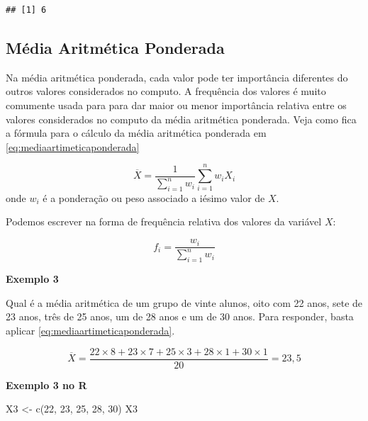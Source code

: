 \documentclass[
]{book}
\newenvironment{Shaded}{\begin{snugshade}}{\end{snugshade}}
\newcommand{\DecValTok}[1]{\textcolor[rgb]{0.00,0.00,0.81}{#1}}
\newcommand{\FunctionTok}[1]{\textcolor[rgb]{0.00,0.00,0.00}{#1}}
\newcommand{\NormalTok}[1]{#1}
\newcommand{\OtherTok}[1]{\textcolor[rgb]{0.56,0.35,0.01}{#1}}
\begin{document}
\begin{verbatim}
## [1] 6
\end{verbatim}

\hypertarget{muxe9dia-aritmuxe9tica-ponderada}{%
\subsection{Média Aritmética Ponderada}\label{muxe9dia-aritmuxe9tica-ponderada}}

Na média aritmética ponderada, cada valor pode ter importância diferentes do outros valores considerados no computo. A frequência dos valores é muito comumente usada para para dar maior ou menor importância relativa entre os valores considerados no computo da média aritmética ponderada. Veja como fica a fórmula para o cálculo da média aritmética ponderada em \eqref{eq:mediaartimeticaponderada}

\begin{equation}
    \overline{X} = \frac{1}{\sum_{i=1}^{n}w_i} \sum_{i=1}^{n} w_i X_i
    \label{eq:mediaartimeticaponderada}
\end{equation}
onde \(w_i\) é a ponderação ou peso associado a iésimo valor de \(X\).

Podemos escrever na forma de frequência relativa dos valores da variável \(X\):

\begin{equation}
  f_i = \frac{w_i}{\sum_{i=1}^{n}w_i}
  \label{eq:eq13}
\end{equation}

\textbf{Exemplo 3}

Qual é a média aritmética de um grupo de vinte alunos, oito com 22 anos, sete
de 23 anos, três de 25 anos, um de 28 anos e um de 30 anos. Para responder,
basta aplicar \eqref{eq:mediaartimeticaponderada}.

\begin{equation*}
  \overline{X} = \frac{22\times 8 + 23\times 7 + 25 \times 3 + 28 \times 1 + 
  30 \times 1}{20} = 23,5
\end{equation*}

\textbf{Exemplo 3 no R}

\begin{Shaded}
\begin{Highlighting}[]
\NormalTok{X3 }\OtherTok{\textless{}{-}} \FunctionTok{c}\NormalTok{(}\DecValTok{22}\NormalTok{, }\DecValTok{23}\NormalTok{, }\DecValTok{25}\NormalTok{, }\DecValTok{28}\NormalTok{, }\DecValTok{30}\NormalTok{)}
\NormalTok{X3}
\end{Highlighting}
\end{Shaded}
\end{document}
